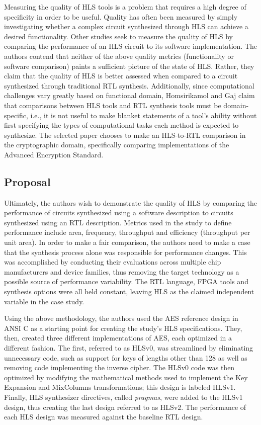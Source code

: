 \documentclass[12pt,journal,compsoc,onecolumn]{IEEEtran}
\begin{document}
Measuring the quality of HLS tools is a problem that requires a high degree of specificity in order to be useful. Quality has often been measured by simply investigating whether a complex circuit synthesized through HLS can achieve a desired functionality\cite{8}\cite{9}\cite{10}\cite{11}\cite{12}. Other studies \cite{3}\cite{4} seek to measure the quality of HLS by comparing the performance of an HLS circuit to its software implementation. The authors contend that neither of the above quality metrics (functionality or software comparison) paints a sufficient picture of the state of HLS. Rather, they claim that the quality of HLS is better assessed when compared to a circuit synthesized through traditional RTL synthesis. Additionally, since computational challenges vary greatly based on functional domain, Homsirikamol and Gaj claim that comparisons between HLS tools and RTL synthesis tools must be domain-specific, i.e., it is not useful to make blanket statements of a tool's ability without first specifying the types of computational tasks each method is expected to synthesize. The selected paper chooses to make an HLS-to-RTL comparison in the cryptographic domain, specifically comparing implementations of the Advanced Encryption Standard.

\subsection{Proposal}

Ultimately, the authors wish to demonstrate the quality of HLS by comparing the performance of circuits synthesized using a software description to circuits synthesized using an RTL description. Metrics used in the study to define performance include area, frequency, throughput and efficiency (throughput per unit area). In order to make a fair comparison, the authors need to make a case that the synthesis process alone was responsible for performance changes. This was accomplished by conducting their evaluations across multiple chip manufacturers and device families, thus removing the target technology as a possible source of performance variability. The RTL language, FPGA tools and synthesis options were all held constant, leaving HLS as the claimed independent variable in the case study. 

Using the above methodology, the authors used the AES reference design in ANSI C \cite{17} as a starting point for creating the study's HLS specifications. They, then, created three different implementations of AES, each optimized in a different fashion. The first, referred to as HLSv0, was streamlined by eliminating unnecessary code, such as support for keys of lengths other than 128 as well as removing code implementing the inverse cipher. The HLSv0 code was then optimized by modifying the mathematical methods used to implement the Key Expansion and MixColumns transformations; this design is labeled HLSv1. Finally, HLS synthesizer directives, called \emph{pragmas}, were added to the HLSv1 design, thus creating the last design referred to as HLSv2. The performance of each HLS design was measured against the baseline RTL design.
\end{document}

